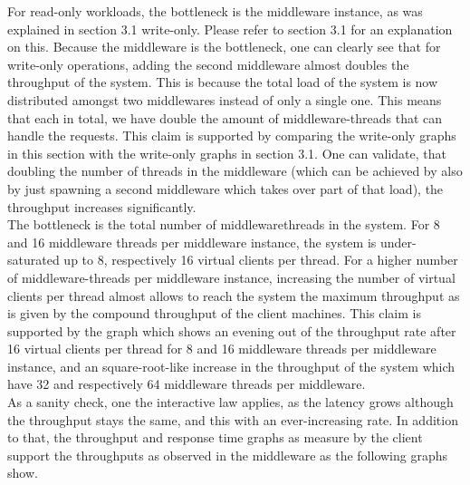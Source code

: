 \documentclass[11pt,a4paper]{article}
\begin{document}
For read-only workloads, the bottleneck is the middleware instance, as was explained in section 3.1 write-only.
Please refer to section 3.1 for an explanation on this.
Because the middleware is the bottleneck, one can clearly see that for write-only operations, adding the second middleware almost doubles the throughput of the system.
This is because the total load of the system is now distributed amongst two middlewares instead of only a single one.
This means that each in total, we have double the amount of middleware-threads that can handle the requests.
This claim is supported by comparing the write-only graphs in this section with the write-only graphs in section 3.1.
One can validate, that doubling the number of threads in the middleware (which can be achieved by also by just spawning a second middleware which takes over part of that load), the throughput increases significantly. \\

The bottleneck is the total number of middlewarethreads in the system.
For 8 and 16 middleware threads per middleware instance, the system is under-saturated up to 8, respectively 16 virtual clients per thread. 
For a higher number of middleware-threads per middleware instance, increasing the number of virtual clients per thread almost allows to reach the system the maximum throughput as is given by the compound throughput of the client machines.
This claim is supported by the graph which shows an evening out of the throughput rate after 16 virtual clients per thread for 8 and 16 middleware threads per middleware instance, and an square-root-like increase in the throughput of the system which have 32 and respectively 64 middleware threads per middleware. \\

As a sanity check, one the interactive law applies, as the latency grows although the throughput stays the same, and this with an ever-increasing rate.
In addition to that, the throughput and response time graphs as measure by the client support the throughputs as observed in the middleware as the following graphs show.
\end{document}
